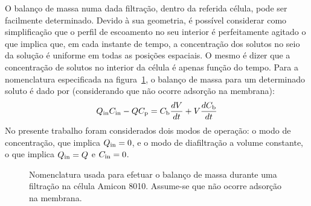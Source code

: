 O balanço de massa numa dada filtração, dentro da referida célula, pode ser facilmente determinado. Devido à sua geometria, é possível considerar como simplificação que o perfil de escoamento no seu interior é perfeitamente agitado o que implica que, em cada instante de tempo, a concentração dos solutos no seio da solução é uniforme em todas as posições espaciais. O mesmo é dizer que a concentração de solutos no interior da célula é apenas função do tempo. Para a nomenclatura especificada na figura~\ref{fig:bal_massa}, o balanço de massa para um determinado soluto é dado por (considerando que não ocorre adsorção na membrana):
\begin{equation}
	\label{eq:balanco_massa_principal}
	Q_{\mathrm{in}}C_{\mathrm{in}}-QC_{\mathrm{p}}=C_{\mathrm{b}}\frac{dV}{dt}+V\frac{dC_{\mathrm{b}}}{dt}
\end{equation}
No presente trabalho foram considerados dois modos de operação: o modo de concentração, que implica $Q_{\mathrm{in}}=0$, e o modo de diafiltração a volume constante, o que implica $Q_{\mathrm{in}}=Q$ e $C_{\mathrm{in}}=0$.
\begin{figure}
	\centering
	
	\caption[Nomenclatura para balanço de massa na célula Amicon 8010]{Nomenclatura usada para efetuar o balanço de massa durante uma filtração na célula Amicon 8010. Assume-se que não ocorre adsorção na membrana.}
	\label{fig:bal_massa}
\end{figure}

